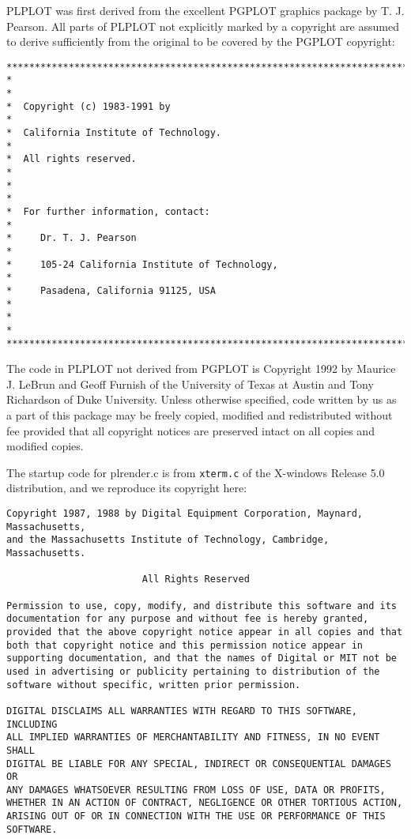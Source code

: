 PLPLOT was first derived from the excellent PGPLOT graphics package by
T.  J. Pearson.  All parts of PLPLOT not explicitly marked by a
copyright are assumed to derive sufficiently from the original to be
covered by the PGPLOT copyright:
\begin{verbatim}
***********************************************************************
*                                                                     *
*  Copyright (c) 1983-1991 by                                         *
*  California Institute of Technology.                                *
*  All rights reserved.                                               *
*                                                                     *
*  For further information, contact:                                  *
*     Dr. T. J. Pearson                                               *
*     105-24 California Institute of Technology,                      *
*     Pasadena, California 91125, USA                                 *
*                                                                     *
***********************************************************************
\end{verbatim}

The code in PLPLOT not derived from PGPLOT is Copyright 1992 by
Maurice J.  LeBrun and Geoff Furnish of the University of Texas at
Austin and Tony Richardson of Duke University.  Unless otherwise
specified, code written by us as a part of this package may be freely
copied, modified and redistributed without fee provided that all
copyright notices are preserved intact on all copies and modified
copies.

The startup code for plrender.c is from {\tt xterm.c} of the X-windows
Release 5.0 distribution, and we reproduce its copyright here:
\begin{verbatim}
Copyright 1987, 1988 by Digital Equipment Corporation, Maynard, Massachusetts,
and the Massachusetts Institute of Technology, Cambridge, Massachusetts.

                        All Rights Reserved

Permission to use, copy, modify, and distribute this software and its 
documentation for any purpose and without fee is hereby granted, 
provided that the above copyright notice appear in all copies and that
both that copyright notice and this permission notice appear in 
supporting documentation, and that the names of Digital or MIT not be
used in advertising or publicity pertaining to distribution of the
software without specific, written prior permission.  

DIGITAL DISCLAIMS ALL WARRANTIES WITH REGARD TO THIS SOFTWARE, INCLUDING
ALL IMPLIED WARRANTIES OF MERCHANTABILITY AND FITNESS, IN NO EVENT SHALL
DIGITAL BE LIABLE FOR ANY SPECIAL, INDIRECT OR CONSEQUENTIAL DAMAGES OR
ANY DAMAGES WHATSOEVER RESULTING FROM LOSS OF USE, DATA OR PROFITS,
WHETHER IN AN ACTION OF CONTRACT, NEGLIGENCE OR OTHER TORTIOUS ACTION,
ARISING OUT OF OR IN CONNECTION WITH THE USE OR PERFORMANCE OF THIS
SOFTWARE.
\end{verbatim}

